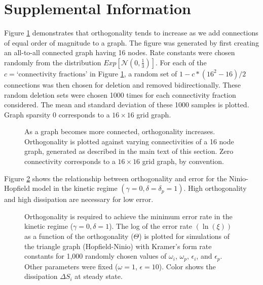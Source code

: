 \clearpage
\section{Supplemental Information}
\label{sec:supplement}
\renewcommand{\thefigure}{S\arabic{figure}}
\setcounter{figure}{0}

Figure \ref{sfig:orth} demonstrates that orthogonality tends to increase as we add connections of equal order of magnitude to a graph.  The figure was generated by first creating an all-to-all connected graph having 16 nodes.  Rate constants were chosen randomly from the distribution $Exp[\mathcal{N}(0,\frac{1}{3})]$.  For each of the $c = \text{`connectivity fractions'}$ in Figure \ref{sfig:orth}, a random set of $1 - c*(16^2-16)/2$ connections was then chosen for deletion and removed bidirectionally.  These random deletion sets were chosen 1000 times for each connectivity fraction considered.  The mean and standard deviation of these 1000 samples is plotted.  Graph sparsity 0 corresponds to a $16\times16$ grid graph.

\begin{figure}[htpb]
\resizebox{0.95\columnwidth}{!}{
 
}
\caption{As a graph becomes more connected, orthogonality increases.  Orthogonality is plotted against varying connectivities of a 16 node graph, generated as described in the main text of this section.  Zero connectivity corresponds to a $16\times 16$ grid graph, by convention.}
\label{sfig:orth}
\end{figure}

Figure \ref{sfig:kin_sim} shows the relationship between orthogonality and error for the Ninio-Hopfield model in the kinetic regime $(\gamma=0,\delta=\delta_p=1)$.  High orthogonality and high dissipation are necessary for low error.
\begin{figure}[htpb]
\resizebox{0.95\columnwidth}{!}{
 
}
\caption{Orthogonality is required to achieve the minimum error rate in the kinetic regime ($\gamma=0, \delta=1$). The log of the error rate $(\ln(\xi))$ as a function of the orthogonality ($\Theta$) is plotted for simulations of the triangle graph (Hopfield-Ninio) with Kramer's form rate constants for 1,000 randomly chosen values of $\omega_i$, $\omega_p$, $\epsilon_i$, and $\epsilon_p$.   Other parameters were fixed  ($\omega=1$, $\epsilon=10$).   Color shows the dissipation $\Delta S_i$ at steady state. \label{sfig:kin_sim}}
\end{figure}

